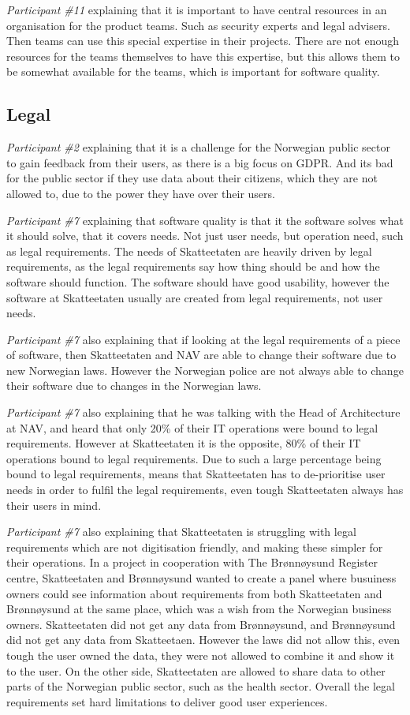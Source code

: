 \textit{Participant \#11} explaining that it is important to have central resources in an organisation for the product teams. Such as security experts and legal advisers. Then teams can use this special expertise in their projects. There are not enough resources for the teams themselves to have this expertise, but this allows them to be somewhat available for the teams, which is important for software quality.

\subsection{Legal}
\textit{Participant \#2} explaining that it is a challenge for the Norwegian public sector to gain feedback from their users, as there is a big focus on GDPR. And its bad for the public sector if they use data about their citizens, which they are not allowed to, due to the power they have over their users.

\textit{Participant \#7} explaining that software quality is that it the software solves what it should solve, that it covers needs. Not just user needs, but operation need, such as legal requirements. The needs of Skatteetaten are heavily driven by legal requirements, as the legal requirements say how thing should be and how the software should function. The software should have good usability, however the software at Skatteetaten usually are created from legal requirements, not user needs.

\textit{Participant \#7} also explaining that if looking at the legal requirements of a piece of software, then Skatteetaten and NAV are able to change their software due to new Norwegian laws. However the Norwegian police are not always able to change their software due to changes in the Norwegian laws.

\textit{Participant \#7} also explaining that he was talking with the Head of Architecture at NAV, and heard that only 20\% of their IT operations were bound to legal requirements. However at Skatteetaten it is the opposite, 80\% of their IT operations bound to legal requirements. Due to such a large percentage being bound to legal requirements, means that Skatteetaten has to de-prioritise user needs in order to fulfil the legal requirements, even tough Skatteetaten always has their users in mind.

\textit{Participant \#7} also explaining that Skatteetaten is struggling with legal requirements which are not digitisation friendly, and making these simpler for their operations. In a project in cooperation with The Brønnøysund Register centre, Skatteetaten and Brønnøysund wanted to create a panel where busuiness owners could see information about requirements from both Skatteetaten and Brønnøysund at the same place, which was a wish from the Norwegian business owners. Skatteetaten did not get any data from Brønnøysund, and Brønnøysund did not get any data from Skatteetaen. However the laws did not allow this, even tough the user owned the data, they were not allowed to combine it and show it to the user. On the other side, Skatteetaten are allowed to share data to other parts of the Norwegian public sector, such as the health sector. Overall the legal requirements set hard limitations to deliver good user experiences.

